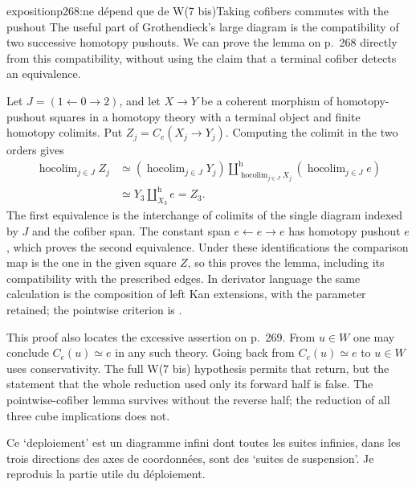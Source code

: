 \begin{dcomment}{exposition}{p268:ne dépend que de W(7 bis)}{Taking cofibers commutes with the pushout}
The useful part of Grothendieck's large diagram is the compatibility of two successive homotopy pushouts. We can prove the lemma on p.~268 directly from this compatibility, without using the claim that a terminal cofiber detects an equivalence.

Let $J=(1\leftarrow0\to2)$, and let $X\to Y$ be a coherent morphism of homotopy-pushout squares in a homotopy theory with a terminal object and finite homotopy colimits. Put $Z_j=C_e(X_j\to Y_j)$. Computing the colimit in the two orders gives
\[
\begin{aligned}
 \mathop{\mathrm{hocolim}}_{j\in J} Z_j
 &\simeq
 \left(\mathop{\mathrm{hocolim}}_{j\in J}Y_j\right)
 \amalg^{\mathrm h}_{\mathop{\mathrm{hocolim}}_{j\in J}X_j}
 \left(\mathop{\mathrm{hocolim}}_{j\in J} e\right)\\
 &\simeq Y_3\amalg^{\mathrm h}_{X_3}e=Z_3.
\end{aligned}
\]
The first equivalence is the interchange of colimits of the single diagram indexed by $J$ and the cofiber span. The constant span $e\leftarrow e\to e$ has homotopy pushout $e$, which proves the second equivalence. Under these identifications the comparison map is the one in the given square $Z$, so this proves the lemma, including its compatibility with the prescribed edges. In derivator language the same calculation is the composition of left Kan extensions, with the parameter retained; the pointwise criterion is \citet[Corollary~3.14]{Groth2013}.

This proof also locates the excessive assertion on p.~269. From $u\in W$ one may conclude $C_e(u)\simeq e$ in any such theory. Going back from $C_e(u)\simeq e$ to $u\in W$ uses conservativity. The full W(7 bis) hypothesis permits that return, but the statement that the whole reduction used only its forward half is false. The pointwise-cofiber lemma survives without the reverse half; the reduction of all three cube implications does not.
\end{dcomment}


Ce `deploiement' est un diagramme infini dont toutes les suites infinies, dans les trois directions des axes de coordonnées, sont des `suites de suspension'. Je reproduis la partie utile du déploiement. %


